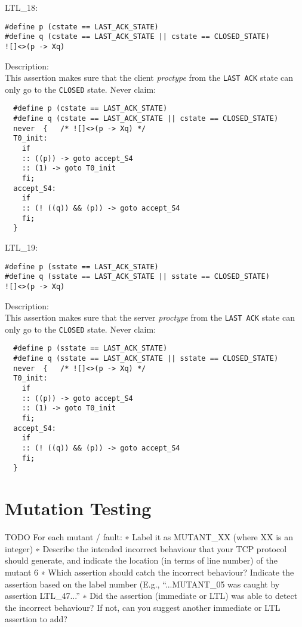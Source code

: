 \documentclass{WigReport} \usepackage{epsfig} %
\begin{document}
LTL\_18:\\
\begin{lstlisting}
#define p (cstate == LAST_ACK_STATE)
#define q (cstate == LAST_ACK_STATE || cstate == CLOSED_STATE)
![]<>(p -> Xq)
\end{lstlisting}
Description:\\
This assertion makes sure that the client \textit{proctype} from the
\verb|LAST ACK| state can only go to the \verb|CLOSED| state.
Never claim:\\
\begin{lstlisting}
  #define p (cstate == LAST_ACK_STATE)
  #define q (cstate == LAST_ACK_STATE || cstate == CLOSED_STATE)
  never  {   /* ![]<>(p -> Xq) */
  T0_init:
    if
    :: ((p)) -> goto accept_S4
    :: (1) -> goto T0_init
    fi;
  accept_S4:
    if
    :: (! ((q)) && (p)) -> goto accept_S4
    fi;
  }
\end{lstlisting}


LTL\_19:\\
\begin{lstlisting}
#define p (sstate == LAST_ACK_STATE)
#define q (sstate == LAST_ACK_STATE || sstate == CLOSED_STATE)
![]<>(p -> Xq)
\end{lstlisting}
Description:\\
This assertion makes sure that the server \textit{proctype} from the
\verb|LAST ACK| state can only go to the \verb|CLOSED| state.
Never claim:\\
\begin{lstlisting}
  #define p (sstate == LAST_ACK_STATE)
  #define q (sstate == LAST_ACK_STATE || sstate == CLOSED_STATE)
  never  {   /* ![]<>(p -> Xq) */
  T0_init:
    if
    :: ((p)) -> goto accept_S4
    :: (1) -> goto T0_init
    fi;
  accept_S4:
    if
    :: (! ((q)) && (p)) -> goto accept_S4
    fi;
  }
\end{lstlisting}


\section{Mutation Testing}

TODO
For each mutant / fault:
∗ Label it as MUTANT\_XX (where XX is an integer)
∗ Describe the intended incorrect behaviour that your TCP protocol should generate, and indicate the location (in terms of line number) of the mutant 6
∗ Which assertion should catch the incorrect behaviour? Indicate the assertion based on the label number (E.g., “...MUTANT\_05 was caught by assertion LTL\_47...”
∗ Did the assertion (immediate or LTL) was able to detect the incorrect behaviour? If not, can you suggest another immediate or LTL assertion to add?
\end{document}
